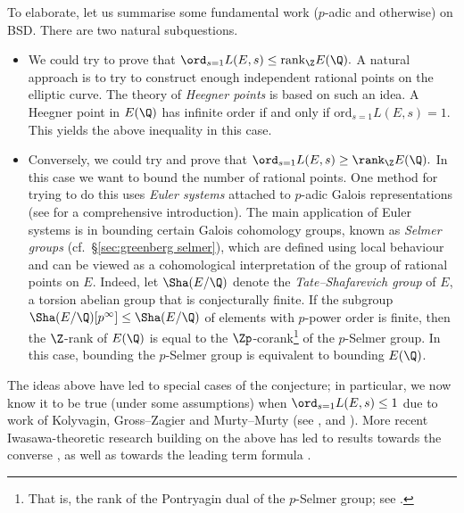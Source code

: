 \documentclass[a4paper,10pt, english, reqno]{smfart}
\numberwithin{equation}{section}
\begin{document}
To elaborate, let us summarise some fundamental work ($p$-adic and otherwise) on BSD. There are two natural subquestions.
\begin{itemize}
	\item[(a)] We could try to prove that $\ord_{s=1} L(E,s) \leq \mathrm{rank}_{\Z} E(\Q).$ A natural approach is to try to construct enough independent rational points on the elliptic curve. 
  The theory of \emph{Heegner points} is based on such an idea. A Heegner point in $E(\Q)$ has infinite order if and only if $\mathrm{ord}_{s=1}L(E,s) = 1$. This yields the above inequality in this case.
	
	\item[(b)] Conversely, we could try and prove that $\ord_{s=1} L(E,s) \geq \rank_{\Z} E(\Q).$ In this case we want to bound the number of rational points. One method for trying to do this uses \emph{Euler systems} attached to $p$-adic Galois representations (see \cite{Rub00} for a comprehensive introduction). The main application of Euler systems is in bounding certain Galois cohomology groups, known as \emph{Selmer groups} (cf.\ \S \ref{sec:greenberg selmer}), which are defined using local behaviour and can be viewed as a cohomological interpretation of the group of rational points on $E$. Indeed, 
let $\Sha(E/\Q)$ denote the \emph{Tate--Shafarevich group} of $E$, a torsion abelian group that is conjecturally finite.
  If the subgroup $\Sha(E/\Q)[p^\infty] \leq \Sha(E/\Q)$ of elements with $p$-power order is finite, then the $\Z$-rank of $E(\Q)$ is equal to the $\Zp$-corank\footnote{That is, the rank of the Pontryagin dual of the $p$-Selmer group; see \cite[\S2.1.4]{Ski18}.} of the $p$-Selmer group. In this case, bounding the $p$-Selmer group is equivalent to bounding $E(\Q)$. 
\end{itemize}

The ideas above have led to special cases of the conjecture; in particular, we now know it to be true (under some assumptions) when $\ord_{s=1}L(E,s) \leq 1$ due to work of Kolyvagin, Gross--Zagier and Murty--Murty (see \cite{Kol88}, \cite{GZ86} and \cite{MM91}). More recent Iwasawa-theoretic research building on the above has led to results towards the converse \cite{Ski20}, as well as towards the leading term formula \cite{JSW15}. 
\end{document}
